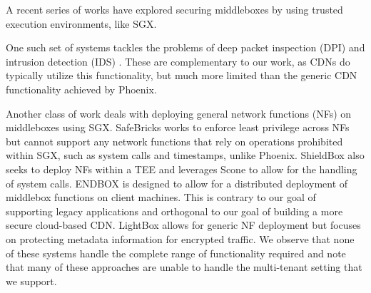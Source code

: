 

A recent series of works have explored securing middleboxes by using trusted execution environments, like SGX.

One such set of systems tackles the problems of deep packet inspection (DPI)
and intrusion detection (IDS) \cite{han2017sgx,
DBLP:journals/corr/abs-1802-00508}.  These are complementary to our work, as
CDNs do typically utilize this functionality, but much more limited than the
generic CDN functionality achieved by Phoenix.

Another class of work deals with deploying general network functions (NFs) on
middleboxes using SGX.  SafeBricks \cite{poddar2018safebricks} works to enforce
least privilege across NFs but cannot support any network functions that rely
on operations prohibited within SGX, such as system calls and timestamps,
unlike Phoenix.  ShieldBox \cite{trach2018shieldbox} also seeks to deploy NFs within a TEE and leverages Scone to allow for the handling of system calls.
ENDBOX \cite{goltzsche2018endbox} is designed to allow for a distributed deployment of middlebox functions on client machines.  This is contrary to our goal of supporting legacy applications and orthogonal to our goal of building a more secure cloud-based CDN.
LightBox \cite{DBLP:journals/corr/DuanYW17} allows for generic NF deployment but focuses on protecting metadata information for encrypted traffic.
We observe that none of these systems handle the complete range of functionality required and note that many of these approaches are unable to handle the multi-tenant setting that we support.

